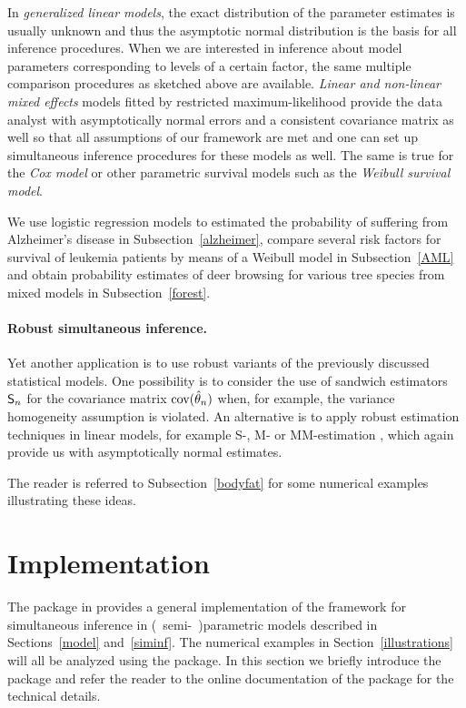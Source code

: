 \documentclass[12pt,a4paper]{article}
\begin{document}
In \emph{generalized linear models}, the exact distribution of the parameter
estimates is usually unknown and thus the asymptotic normal distribution is
the basis for all inference procedures. When we are interested in inference
about model parameters corresponding to levels of a certain factor, the same
multiple comparison procedures as sketched above are available. \emph{Linear
and non-linear mixed effects} models fitted by restricted maximum-likelihood
provide the data analyst with asymptotically normal errors and a consistent
covariance matrix as well so that all assumptions of our framework are met
and one can set up simultaneous inference procedures for these models as
well. The same is true for the \emph{Cox model} or other parametric survival
models such as the \emph{Weibull survival model}.

We use logistic regression models to estimated the probability of suffering
from Alzheimer's disease in Subsection~\ref{alzheimer}, compare several risk
factors for survival of leukemia patients by means of a Weibull model in
Subsection~\ref{AML} and obtain probability estimates of deer browsing for
various tree species from mixed models in Subsection~\ref{forest}.

\paragraph{Robust simultaneous inference.}

Yet another application is to use robust variants of the previously
discussed statistical models. One possibility is to consider the use of
sandwich estimators $\textsf{S}_n$ for the covariance matrix
$\text{cov}(\hat{\theta}_n)$ when,
for example, the variance homogeneity assumption is violated. An alternative
is to apply robust estimation techniques in linear models, for example S-,
M- or MM-estimation 
\citep[see][for
example]{RousseeuwLeroy2003, mfluc:Stefanski+Boos:2002, Yohai1987, mfluc:White:1994}%
, which again provide us with asymptotically normal estimates.

The reader is referred to Subsection~\ref{bodyfat} for some numerical
examples illustrating these ideas.

\section{Implementation}

\label{implementation}

The  package \citep{pkg:multcomp} in \RR{} \citep{rcore2007}
provides a general implementation of the framework for simultaneous
inference in (~semi-~)\-parametric models described in Sections~\ref{model}
and~\ref{siminf}. The numerical examples in Section~\ref{illustrations} will
all be analyzed using the  package. In this section we
briefly introduce the  package and refer the reader to
the online documentation of the package for the technical details.
\end{document}
